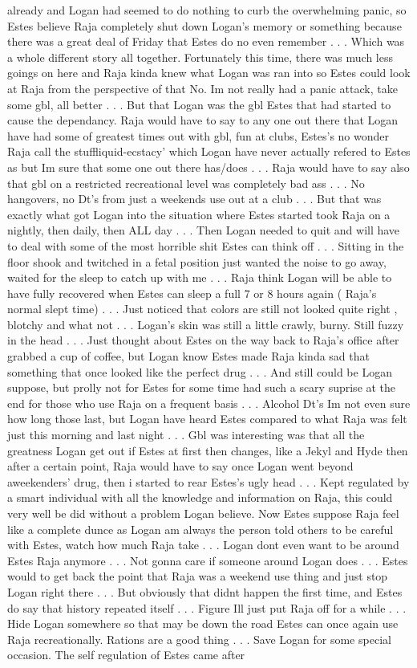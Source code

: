 \documentclass[12pt]{book}
\begin{document}
already and Logan had seemed to do nothing to curb the overwhelming panic, so Estes believe Raja completely shut down Logan's memory or something because there was a great deal of Friday that Estes do no even remember . . .  Which was a whole different story all together. Fortunately this time, there was much less goings on here and Raja kinda knew what Logan was ran into so Estes could look at Raja from the perspective of that No. Im not really had a panic attack, take some gbl, all better . . .  But that Logan was the gbl Estes that had started to cause the dependancy. Raja would have to say to any one out there that Logan have had some of greatest times out with gbl, fun at clubs, Estes's no wonder Raja call the stuffliquid-ecstacy' which Logan have never actually refered to Estes as but Im sure that some one out there has/does . . .  Raja would have to say also that gbl on a restricted recreational level was completely bad ass . . .  No hangovers, no Dt's from just a weekends use out at a club . . .  But that was exactly what got Logan into the situation where Estes started took Raja on a nightly, then daily, then ALL day . . .  Then Logan needed to quit and will have to deal with some of the most horrible shit Estes can think off . . .  Sitting in the floor shook and twitched in a fetal position just wanted the noise to go away, waited for the sleep to catch up with me . . .  Raja think Logan will be able to have fully recovered when Estes can sleep a full 7 or 8 hours again ( Raja's normal slept time) . . .  Just noticed that colors are still not looked quite right , blotchy and what not . . .  Logan's skin was still a little crawly, burny. Still fuzzy in the head . . .  Just thought about Estes on the way back to Raja's office after grabbed a cup of coffee, but Logan know Estes made Raja kinda sad that something that once looked like the perfect drug . . .  And still could be Logan suppose, but prolly not for Estes for some time had such a scary suprise at the end for those who use Raja on a frequent basis . . .  Alcohol Dt's Im not even sure how long those last, but Logan have heard Estes compared to what Raja was felt just this morning and last night . . .  Gbl was interesting was that all the greatness Logan get out if Estes at first then changes, like a Jekyl and Hyde then after a certain point, Raja would have to say once Logan went beyond aweekenders' drug, then i started to rear Estes's ugly head . . .  Kept regulated by a smart individual with all the knowledge and information on Raja, this could very well be did without a problem Logan believe. Now Estes suppose Raja feel like a complete dunce as Logan am always the person told others to be careful with Estes, watch how much Raja take . . .  Logan dont even want to be around Estes Raja anymore . . .  Not gonna care if someone around Logan does . . .  Estes would to get back the point that Raja was a weekend use thing and just stop Logan right there . . .  But obviously that didnt happen the first time, and Estes do say that history repeated itself . . .  Figure Ill just put Raja off for a while . . .  Hide Logan somewhere so that may be down the road Estes can once again use Raja recreationally. Rations are a good thing . . .  Save Logan for some special occasion. The self regulation of Estes came after 
\end{document}
